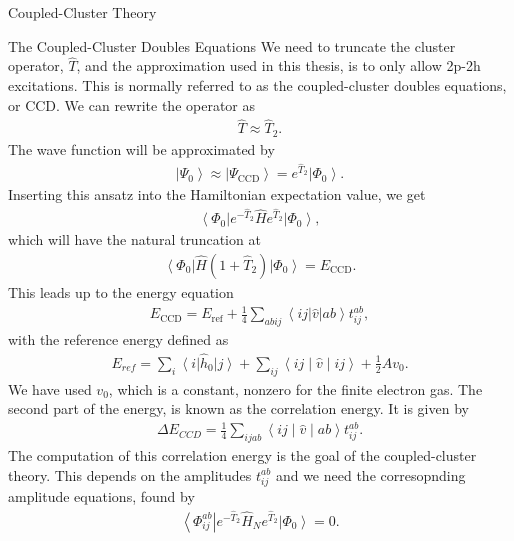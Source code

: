 \documentclass[twoside,english]{uiofysmaster}
\begin{document}
\begin{chapter}{Coupled-Cluster Theory}
  	\begin{section}{The Coupled-Cluster Doubles Equations}
  		We need to truncate the cluster operator, $\hat T$, and the approximation used in this thesis, is to only allow 2p-2h excitations. This is normally referred to as the coupled-cluster doubles equations, or CCD. We can rewrite the operator as \cite{MHJonline}
  		\begin{align}
  			\hat T \approx \hat T_2.
  		\end{align}
  		The wave function will be approximated by 
  		\begin{align}
  			\left| \Psi_0 \right> \approx \left| \Psi_{\text{CCD}} \right> = e^{\hat T_2} \left| \Phi_0 \right>.
  		\end{align}
  		Inserting this ansatz into the Hamiltonian expectation value, we get
  		\begin{align}
  			\left< \Phi_0 \right| e^{-\hat T_2} \hat H e^{\hat T_2} \left| \Phi_0 \right> ,
  		\end{align}
  		which will have the natural truncation at 
  		\begin{align}
  			\left< \Phi_0 \right|  \hat H (1 + \hat T_2) \left| \Phi_0 \right> = E_{\text{CCD}}.
  		\end{align}
  		This leads up to the energy equation
  		\begin{align}
  			E_{\text{CCD}} = E_{\text{ref}} + \frac{1}{4} \sum_{abij} \left<ij|\hat v|ab\right> t_{ij}^{ab},
  		\end{align}
  		with the reference energy defined as 
  		\begin{align}
  			E_{ref} = \sum_i \left< i \right| \hat h_0 \left| j\right> + \sum_{ij} \left<ij\middle|\hat v\middle|ij\right> + \frac{1}{2}Av_0.
  		\end{align}
  		We have used $v_0$, which is a constant, nonzero for the finite electron gas. The second part of the energy, is known as the correlation energy. It is given by
  		\begin{align}
  			\Delta E_{CCD} = \frac{1}{4} \sum_{ijab}\left<ij\middle|\hat v\middle|ab\right> t_{ij}^{ab}.
  		\end{align}
  		The computation of this correlation energy is the goal of the coupled-cluster theory. This depends on the amplitudes $t_{ij}^{ab}$ and we need the corresopnding amplitude equations, found by
  		\begin{align}
  			\left< \Phi_{ij}^{ab} \right| e^{-\hat T_2} \hat H_N e^{\hat T_2} \left| \Phi_0 \right> = 0.
  		\end{align}

\end{section}
\end{chapter}
\end{document}
